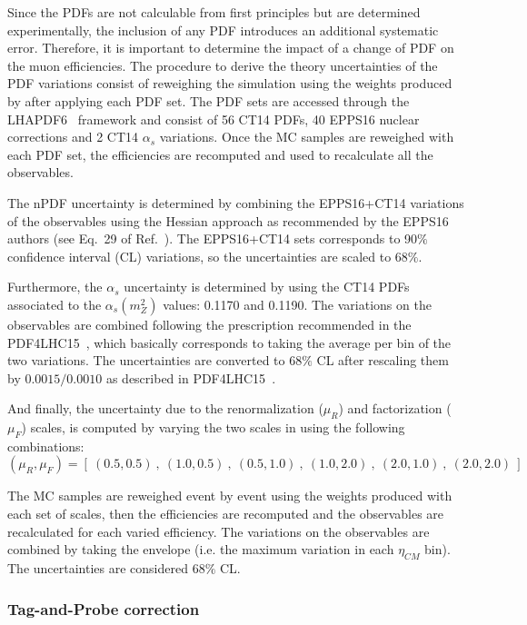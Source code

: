 Since the PDFs are not calculable from first principles but are determined experimentally, the inclusion of any PDF introduces an additional systematic error. Therefore, it is important to determine the impact of a change of PDF on the muon efficiencies. The procedure to derive the theory uncertainties of the PDF variations consist of reweighing the simulation using the weights produced by \POWHEG after applying each PDF set. The PDF sets are accessed through the LHAPDF6~\cite{LHAPDF6} framework and consist of 56 CT14 PDFs, 40 EPPS16 nuclear corrections and 2 CT14 $\alpha_{s}$ variations. Once the MC samples are reweighed with each PDF set, the efficiencies are recomputed and used to recalculate all the observables.

The nPDF uncertainty is determined by combining the EPPS16+CT14 variations of the observables using the Hessian approach as recommended by the EPPS16 authors (see Eq.~29 of Ref.~\cite{EPS09}). The EPPS16+CT14 sets corresponds to 90$\%$ confidence interval (CL) variations, so the uncertainties are scaled to 68$\%$.

Furthermore, the $\alpha_{s}$ uncertainty is determined by using the CT14 PDFs associated to the $\alpha_{s}\left(m_{Z}^{2}\right)$ values: 0.1170 and 0.1190. The variations on the observables are combined following the prescription recommended in the PDF4LHC15~\cite{PDF4LHC}, which basically corresponds to taking the average per bin of the two variations. The uncertainties are converted to 68$\%$ CL after rescaling them by $0.0015/0.0010$ as described in PDF4LHC15~\cite{PDF4LHC}.

And finally, the uncertainty due to the renormalization ($\mu_{R}$) and factorization ($\mu_{F}$) scales, is computed by varying the two scales in \POWHEG using the following combinations:
\begin{equation*}
(\mu_{R} , \mu_{F}) = [\ (0.5 , 0.5)\ ,\ (1.0 , 0.5)\ ,\ (0.5 , 1.0)\ ,\ (1.0 , 2.0)\ ,\ (2.0 , 1.0)\ ,\ (2.0 , 2.0)\ ]
\end{equation*}

The MC samples are reweighed event by event using the \POWHEG weights produced with each set of scales, then the efficiencies are recomputed and the observables are recalculated for each varied efficiency. The variations on the observables are combined by taking the envelope (i.e. the maximum variation in each $\eta_{CM}$ bin). The uncertainties are considered 68$\%$ CL.


\subsubsection{Tag-and-Probe correction}

